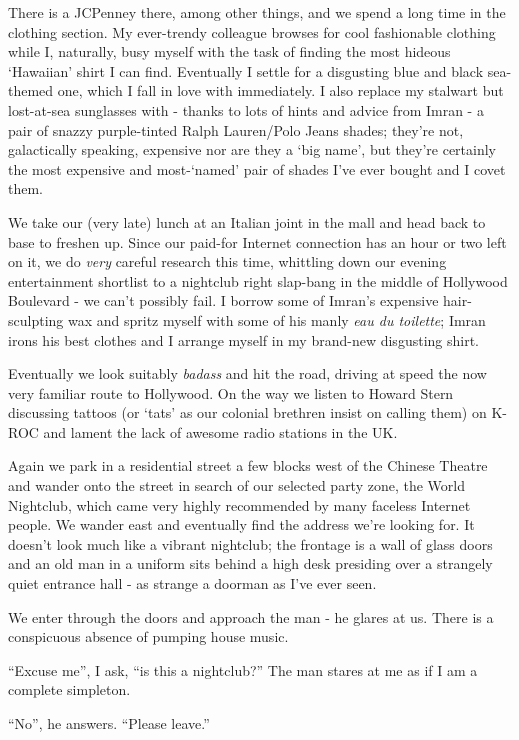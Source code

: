 \documentclass[a5paper,titlepage,11pt,draft]{book}
\begin{document}
There is a JCPenney there, among other things, and we spend a long time in the clothing section.  My ever-trendy colleague browses for cool fashionable clothing while I, naturally, busy myself with the task of finding the most hideous `Hawaiian' shirt I can find.  Eventually I settle for a disgusting blue and black sea-themed one, which I fall in love with immediately.  I also replace my stalwart but lost-at-sea sunglasses with - thanks to lots of hints and advice from Imran - a pair of snazzy purple-tinted Ralph Lauren/Polo Jeans shades; they're not, galactically speaking, expensive nor are they a `big name', but they're certainly the most expensive and most-`named' pair of shades I've ever bought and I covet them.

We take our (very late) lunch at an Italian joint in the mall and head back to base to freshen up.  Since our paid-for Internet connection has an hour or two left on it, we do \emph{very} careful research this time, whittling down our evening entertainment shortlist to a nightclub right slap-bang in the middle of Hollywood Boulevard - we can't possibly fail.  I borrow some of Imran's expensive hair-sculpting wax and spritz myself with some of his manly \emph{eau du toilette}; Imran irons his best clothes and I arrange myself in my brand-new disgusting shirt.

Eventually we look suitably \emph{badass} and hit the road, driving at speed the now very familiar route to Hollywood.  On the way we listen to Howard Stern discussing tattoos (or `tats' as our colonial brethren insist on calling them) on K-ROC and lament the lack of awesome radio stations in the UK.

Again we park in a residential street a few blocks west of the Chinese Theatre and wander onto the street in search of our selected party zone, the World Nightclub, which came very highly recommended by many faceless Internet people.  We wander east and eventually find the address we're looking for.  It doesn't look much like a vibrant nightclub; the frontage is a wall of glass doors and an old man in a uniform sits behind a high desk presiding over a strangely quiet entrance hall - as strange a doorman as I've ever seen.

We enter through the doors and approach the man - he glares at us.  There is a conspicuous absence of pumping house music.

``Excuse me'', I ask, ``is this a nightclub?''  The man stares at me as if I am a complete simpleton.

``No'', he answers.  ``Please leave.''
\end{document}
